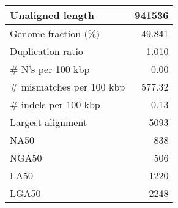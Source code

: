 \documentclass[12pt,a4paper]{article}
\begin{document}
\begin{table}[ht]
\begin{center}
\begin{tabular}{|l*{1}{|r}|}
Unaligned length & 941536 \\ \hline
Genome fraction (\%) & 49.841 \\ \hline
Duplication ratio & 1.010 \\ \hline
\# N's per 100 kbp & 0.00 \\ \hline
\# mismatches per 100 kbp & 577.32 \\ \hline
\# indels per 100 kbp & 0.13 \\ \hline
Largest alignment & 5093 \\ \hline
NA50 & 838 \\ \hline
NGA50 & 506 \\ \hline
LA50 & 1220 \\ \hline
LGA50 & 2248 \\ \hline
\end{tabular}
\end{center}
\end{table}
\end{document}
